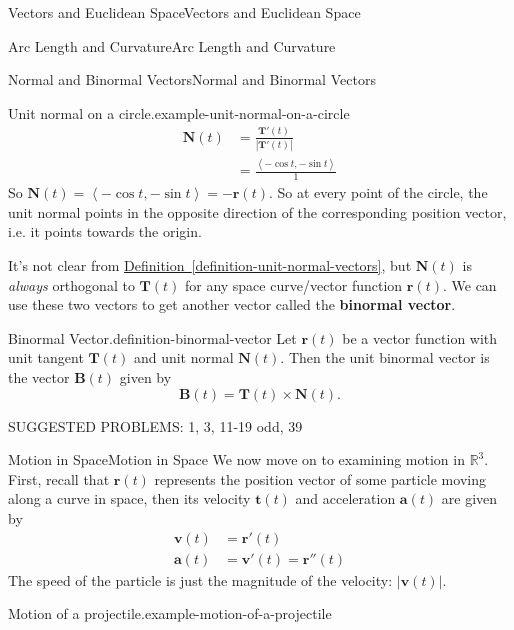 \documentclass[10pt,]{book}
\newcommand{\terminology}[1]{\textbf{#1}}
\numberwithin{equation}{section}
\newcommand{\RR}{\mathbb{R}}
\newcommand{\vv}[1]{\mathbf{#1}}
\newcommand{\dotprod}[1]{\left\langle #1 \right\rangle}
\begin{document}
\begin{chapterptx}{Vectors and Euclidean Space}{}{Vectors and Euclidean Space}{}{}
\begin{sectionptx}{Arc Length and Curvature}{}{Arc Length and Curvature}{}{}
\begin{subsectionptx}{Normal and Binormal Vectors}{}{Normal and Binormal Vectors}{}{}
\begin{example}{Unit normal on a circle.}{example-unit-normal-on-a-circle}
%
\begin{align*}
\vv{N}(t) & = \frac{\vv{T}'(t)}{|\vv{T}'(t)|} \\
& = \frac{\dotprod{-\cos t, -\sin t}}{1} 
\end{align*}
\hypertarget{p-1086}{}%
So \(\vv{N}(t) = \dotprod{-\cos t, -\sin t} = -\vv{r}(t)\). So at every point of the circle, the unit normal points in the opposite direction of the corresponding position vector, i.e. it points towards the origin.%
\end{example}
\hypertarget{p-1087}{}%
It's not clear from \hyperref[definition-unit-normal-vectors]{Definition~\ref{definition-unit-normal-vectors}}, but \(\vv{N}(t)\) is \emph{always} orthogonal to \(\vv{T}(t)\) for any space curve/vector function \(\vv{r}(t)\). We can use these two vectors to get another vector called the \terminology{binormal vector}.%
\begin{definition}{Binormal Vector.}{definition-binormal-vector}%
\hypertarget{p-1088}{}%
Let \(\vv{r}(t)\) be a vector function with unit tangent \(\vv{T}(t)\) and unit normal \(\vv{N}(t)\). Then the unit binormal vector is the vector \(\vv{B}(t)\) given by%
%
\begin{equation*}
\vv{B}(t) = \vv{T}(t)\times\vv{N}(t).
\end{equation*}
\end{definition}
\hypertarget{p-1089}{}%
SUGGESTED PROBLEMS: 1, 3, 11-19 odd, 39%
\end{subsectionptx}
\end{sectionptx}
%
%
\typeout{************************************************}
\typeout{************************************************}
%
\begin{sectionptx}{Motion in Space}{}{Motion in Space}{}{}\label{section-motion-in-space}
\hypertarget{p-1090}{}%
We now move on to examining motion in \(\RR^{3}\). First, recall that \(\vv{r}(t)\) represents the position vector of some particle moving along a curve in space, then its velocity \(\vv{t}(t)\) and acceleration \(\vv{a}(t)\) are given by%
%
\begin{align*}
\vv{v}(t) & = \vv{r}'(t) \\
\vv{a}(t) & = \vv{v}'(t) = \vv{r}''(t) 
\end{align*}
\hypertarget{p-1091}{}%
The speed of the particle is just the magnitude of the velocity: \(|\vv{v}(t)|\).%
\begin{example}{Motion of a projectile.}{example-motion-of-a-projectile}%

\end{example}
\end{sectionptx}
\end{chapterptx}
\end{document}
